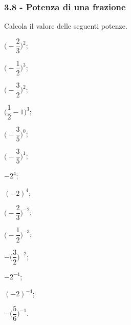 \subsubsection*{3.8 - Potenza di una frazione}

\begin{esercizio}
 \label{ese:3.56}
Calcola il valore delle seguenti potenze.
\begin{multicols}{4}
\begin{enumeratea}
\spazielenx
 \item $\bigg(-\dfrac{2}{3}\bigg)^2$;
 \item $\bigg(-\dfrac{1}{2}\bigg)^3$;
 \item $\bigg(-\dfrac{3}{2}\bigg)^2$;
 \item $\bigg(\dfrac{1}{2}-1\bigg)^3$;
 \item $\bigg(-\dfrac{3}{5}\bigg)^0$;
 \item $\bigg(-\dfrac{3}{5}\bigg)^1$;
 \item $-2^4$;
 \item $(-2)^4$;
 \item $\bigg(-\dfrac{2}{3}\bigg)^{-2}$;
 \item $\bigg(-\dfrac{1}{2}\bigg)^{-3}$;
 \item $-\bigg(\dfrac{3}{2}\bigg)^{-2}$;
 \item $-2^{-4}$;
 \item $(-2)^{-4}$;
 \item $-\bigg(\dfrac{5}{6}\bigg)^{-1}$.
\end{enumeratea}
\end{multicols}
\end{esercizio}

